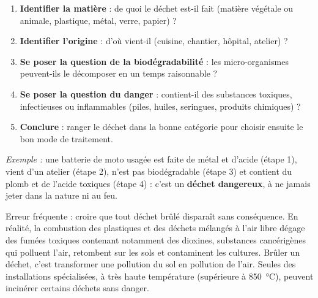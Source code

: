 \documentclass[11pt]{article}
\newcommand{\cle}[1]{{\popxbold\color{popdark}#1}}
\begin{document}
\begin{methode}
\begin{enumerate}
\item \textbf{Identifier la matière} : de quoi le déchet est-il fait (matière végétale ou animale, plastique, métal, verre, papier) ?
\item \textbf{Identifier l'origine} : d'où vient-il (cuisine, chantier, hôpital, atelier) ?
\item \textbf{Se poser la question de la biodégradabilité} : les micro-organismes peuvent-ils le décomposer en un temps raisonnable ?
\item \textbf{Se poser la question du danger} : contient-il des substances toxiques, infectieuses ou inflammables (piles, huiles, seringues, produits chimiques) ?
\item \textbf{Conclure} : ranger le déchet dans la bonne catégorie pour choisir ensuite le bon mode de traitement.
\end{enumerate}
\emph{Exemple :} une batterie de moto usagée est faite de métal et d'acide (étape 1), vient d'un atelier (étape 2), n'est pas biodégradable (étape 3) et contient du plomb et de l'acide toxiques (étape 4) : c'est un \textbf{déchet dangereux}, à ne jamais jeter dans la nature ni au feu.
\end{methode}

\begin{attention}
Erreur fréquente : croire que tout déchet brûlé disparaît sans conséquence. En réalité, la combustion des plastiques et des déchets mélangés à l'air libre dégage des \cle{fumées toxiques} contenant notamment des \cle{dioxines}, substances cancérigènes qui polluent l'air, retombent sur les sols et contaminent les cultures. Brûler un déchet, c'est transformer une pollution du sol en pollution de l'air. Seules des installations spécialisées, à très haute température (supérieure à \SI{850}{\celsius}), peuvent incinérer certains déchets sans danger.
\end{attention}
\end{document}
